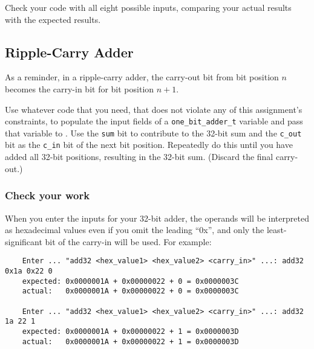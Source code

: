Check your code with all eight possible inputs, comparing your actual results with the expected results.


\subsection{Ripple-Carry Adder} \label{subsec:ripple-carry-adder}

\begin{description}
\end{description}
As a reminder, in a ripple-carry adder, the carry-out bit from bit position $n$ becomes the carry-in bit for bit position $n+1$.

Use whatever code that you need, that does not violate any of this assignment's constraints, to populate the input fields of a \lstinline{one_bit_adder_t} variable and pass that variable to .
Use the \lstinline{sum} bit to contribute to the 32-bit sum and the \lstinline{c_out} bit as the \lstinline{c_in} bit of the next bit position.
Repeatedly do this until you have added all 32-bit positions, resulting in the 32-bit sum.
(Discard the final carry-out.)

\subsubsection*{Check your work}

\begin{description}
\end{description}
When you enter the inputs for your 32-bit adder, the operands will be interpreted as hexadecimal values even if you omit the leading ``0x'', and only the least-significant bit of the carry-in will be used.
For example:
\begin{verbatim}
    Enter ... "add32 <hex_value1> <hex_value2> <carry_in>" ...: add32 0x1a 0x22 0
    expected: 0x0000001A + 0x00000022 + 0 = 0x0000003C
    actual:   0x0000001A + 0x00000022 + 0 = 0x0000003C

    Enter ... "add32 <hex_value1> <hex_value2> <carry_in>" ...: add32 1a 22 1
    expected: 0x0000001A + 0x00000022 + 1 = 0x0000003D
    actual:   0x0000001A + 0x00000022 + 1 = 0x0000003D
\end{verbatim}

\begin{description}
\end{description}

